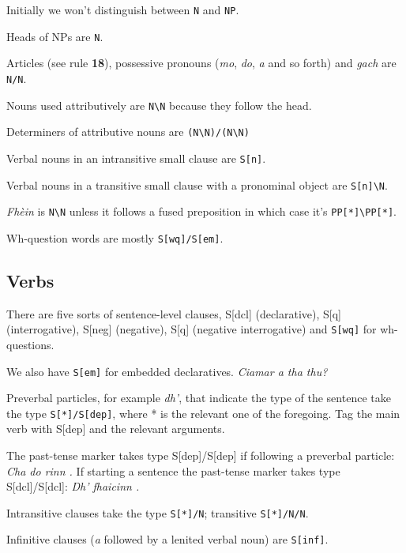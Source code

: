 \documentclass[a4paper]{article}
\begin{document}
Initially we won't distinguish between \texttt{N} and \texttt{NP}.

 Heads of NPs are \texttt{N}.

 Articles (see rule {\bf 18}), possessive pronouns (\textit{mo}, \textit{do}, \textit{a} and so forth) and \textit{gach} are \texttt{N/N}.

 Nouns used attributively are \texttt{N\textbackslash N} because they follow the head.

 Determiners of attributive nouns are \texttt{(N\textbackslash N)/(N\textbackslash N)}

 Verbal nouns in an intransitive small clause are \texttt{S[n]}.

 Verbal nouns in a transitive small clause with a pronominal object are \texttt{S[n]\textbackslash N}.

 \textit{Fh\`ein} is \texttt{N\textbackslash N} unless it follows a fused preposition in which case it's \texttt{PP[*]\textbackslash PP[*]}.

 Wh-question words are mostly \texttt{S[wq]/S[em]}.

\subsection{Verbs}

 There are five sorts of sentence-level clauses, S[dcl] (declarative), S[q] (interrogative), S[neg] (negative), S[q] (negative interrogative) and \texttt{S[wq]} for wh-questions.

 We also have \texttt{S[em]} for embedded declaratives. \textit{Ciamar a tha thu?}

 Preverbal particles, for example \textit{dh'}, that indicate the type of the sentence take the type \texttt{S[*]/S[dep]}, where * is the relevant one of the foregoing. Tag the main verb with S[dep] and the relevant arguments.

 The past-tense marker takes type S[dep]/S[dep] if following a preverbal particle: \textit{Cha do rinn .}
If starting a sentence the past-tense marker takes type S[dcl]/S[dcl]: \textit{Dh' fhaicinn .}

 Intransitive clauses take the type \texttt{S[*]/N}; transitive \texttt{S[*]/N/N}.

 Infinitive clauses (\textit{a} followed by a lenited verbal noun) are \texttt{S[inf]}.
\end{document}
